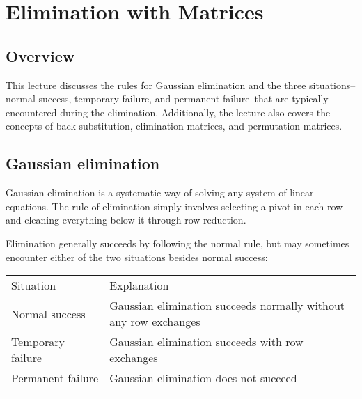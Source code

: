 \documentclass[../main.tex]{subfiles}
\begin{document}
\section{Elimination with Matrices}


\subsection{Overview}
This lecture discusses the rules for Gaussian elimination and the three situations--normal success, temporary failure, and permanent failure--that are typically encountered during the elimination. Additionally, the lecture also covers the concepts of back substitution, elimination matrices, and permutation matrices.


\subsection{Gaussian elimination}
Gaussian elimination is a systematic way of  solving any system of linear equations. The rule of elimination simply involves selecting a pivot in each row and cleaning everything below it through row reduction.
\vspace{0.5em}

Elimination generally succeeds by following the normal rule, but may sometimes encounter either of the two situations besides normal success:

\begin{tabular}{@{}ll@{}}
    \trule
    \textrm{Situation} & \textrm{Explanation}                                     \\
    \mrule
    Normal success     & \makecell{Gaussian elimination succeeds normally without \\ any row exchanges} \\
    Temporary failure  & Gaussian elimination succeeds with row exchanges         \\
    Permanent failure  & Gaussian elimination does not succeed                    \\
    \brule
\end{tabular}
\vspace{0.5em}
\end{document}
